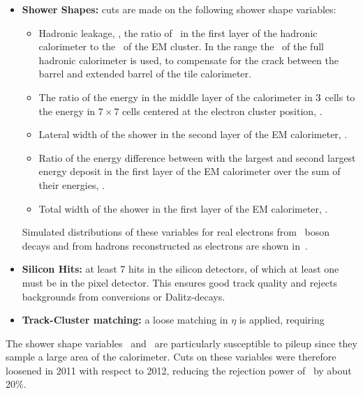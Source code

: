 \begin{itemize}

    \item {\bf Shower Shapes:} cuts are made on the following shower shape
    variables:

    \begin{itemize}
        \item Hadronic leakage, \Rhad, the ratio of \et\ in the first layer of
        the hadronic calorimeter to the \et\ of the EM cluster. In the range
         the \et\ of the full hadronic calorimeter is
        used, to compensate for the crack between the barrel and extended barrel
        of the tile calorimeter.
        \item The ratio of the energy in the middle layer of the
        calorimeter in $3 \time 7$ cells to the energy in $7
        \times 7$ cells centered at the electron cluster position, \Reta.
        \item Lateral width of the shower in the second layer of the EM
        calorimeter, \wetatwo.
        \item Ratio of the energy difference between with the largest and second
        largest energy deposit in the first layer of the EM calorimeter over the
        sum of their energies, \Eratio.
        \item Total width of the shower in the first layer of the EM
        calorimeter, \wstot.
    \end{itemize}

    Simulated distributions of these variables for real electrons from \Z\ boson
    decays and from hadrons reconstructed as electrons are shown
    in~.

    \item {\bf Silicon Hits:} at least 7 hits in the silicon detectors, of which at
    least one must be in the pixel detector. This ensures good track quality and
    rejects backgrounds from conversions or Dalitz-decays.
    \item {\bf Track-Cluster matching:} a loose matching in $\eta$ is applied,
    requiring 
\end{itemize}

The shower shape variables \Reta\ and \Rhad\ are particularly susceptible to
pileup since they sample a large area of the calorimeter. Cuts on these
variables were therefore
loosened in 2011 with respect to 2012, reducing the rejection power of \loosePP\
by about 20\%.

